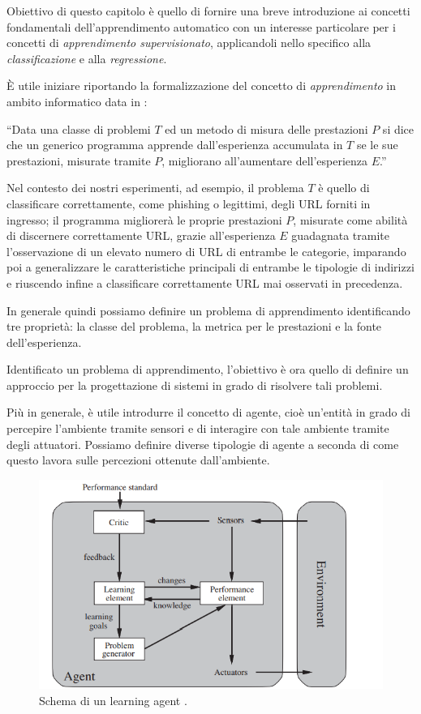 \documentclass[../../main.tex]{subfiles}
\begin{document}
    Obiettivo di questo capitolo è quello di fornire una breve introduzione ai concetti fondamentali dell'apprendimento automatico con un interesse particolare per i concetti di \textit{apprendimento supervisionato}, applicandoli nello specifico alla \textit{classificazione} e alla \textit{regressione}.

    È utile iniziare riportando la formalizzazione del concetto di \textit{apprendimento} in ambito informatico data in \cite{Mitchell97}:
    
    ``Data una classe di problemi $T$ ed un metodo di misura delle prestazioni $P$ si dice che un generico programma apprende dall'esperienza accumulata in $T$ se le sue prestazioni, misurate tramite $P$, migliorano all'aumentare dell'esperienza $E$.'' 

    Nel contesto dei nostri esperimenti, ad esempio, il problema $T$ è quello di classificare correttamente, come phishing o legittimi, degli URL forniti in ingresso; il programma migliorerà le proprie prestazioni $P$, misurate come abilità di discernere correttamente URL, grazie all'esperienza  $E$ guadagnata tramite l'osservazione di un elevato numero di URL di entrambe le categorie, imparando poi a generalizzare le caratteristiche principali di entrambe le tipologie di indirizzi e riuscendo infine a classificare correttamente  URL mai osservati in precedenza.

    In generale quindi possiamo definire un problema di apprendimento identificando tre proprietà: la classe del problema, la metrica per le prestazioni e la fonte dell'esperienza.

    Identificato un problema di apprendimento, l'obiettivo è ora quello di definire un approccio per la progettazione di sistemi in grado di risolvere tali problemi.

    Più in generale, è utile introdurre il concetto di agente, cioè un'entità in grado di percepire l'ambiente tramite sensori e di interagire con tale ambiente tramite degli attuatori. Possiamo definire diverse tipologie di agente a seconda di come questo lavora sulle percezioni ottenute dall'ambiente.

    \begin{figure}[H]
        \centering
        \includegraphics[width =\textwidth]{immagini/4_0/learning_agent.png}
        \caption{Schema di un learning agent \cite{russel2010}.}
        \label{fig:learning_agent}
    \end{figure}
\end{document}
